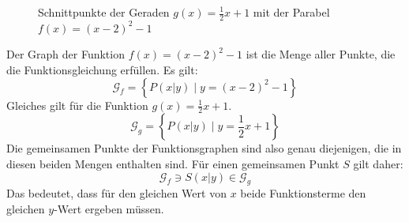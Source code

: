 \begin{figure}
 \begin{center}
 \end{center}
\caption{Schnittpunkte der Geraden \(g(x)=\frac{1}{2}x+1\) mit der Parabel \(f(x)=(x-2)^2-1\)}
\end{figure}

Der Graph der Funktion \(f(x)=(x-2)^2-1\) ist die Menge aller Punkte, die die Funktionsgleichung erfüllen. Es gilt:
\begin{equation*}
 \mathcal{G}_f = \left\lbrace P(x|y) \mid y=(x-2)^2-1 \right\rbrace
\end{equation*}
Gleiches gilt für die Funktion \(g(x)=\frac{1}{2}x+1\).
\begin{equation*}
 \mathcal{G}_g = \left\lbrace P(x|y) \mid y=\frac{1}{2}x+1 \right\rbrace
\end{equation*}
Die gemeinsamen Punkte der Funktionsgraphen sind also genau diejenigen, die in diesen beiden Mengen enthalten sind. Für einen gemeinsamen Punkt \(S\) gilt daher:
\begin{equation*}
 \mathcal{G}_f \ni S(x|y) \in \mathcal{G}_g
\end{equation*}
Das bedeutet, dass für den gleichen Wert von \(x\) beide Funktionsterme den gleichen \(y\)-Wert ergeben müssen.

